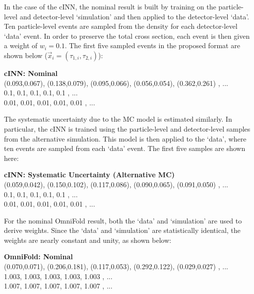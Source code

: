 \documentclass[a4paper,11pt]{article}
\begin{document}
In the case of the cINN, the nominal result is built by training on the particle-level and detector-level `simulation' and then applied to the detector-level `data'.  Ten particle-level events are sampled from the density for each detector-level `data' event.  In order to preserve the total cross section, each event is then given a weight of $w_i=0.1$.  The first five sampled events in the proposed format are shown below ($\vec{x}_i=(\tau_{1,i},\tau_{2,i})$):

\vspace{5mm}

 \begin{tcolorbox}
\textbf{cINN: Nominal}\\
(0.093,0.067), (0.138,0.079), (0.095,0.066), (0.056,0.054), (0.362,0.261) , ... \\
0.1, 0.1, 0.1, 0.1, 0.1 , ... \\
0.01, 0.01, 0.01, 0.01, 0.01 , ...
 \end{tcolorbox}
 
\noindent The systematic uncertainty due to the MC model is estimated similarly.  In particular, the cINN is trained using the particle-level and detector-level samples from the alternative simulation.  This model is then applied to the `data', where ten events are sampled from each `data' event.  The first five samples are shown here:
 
 \vspace{5mm}
 
  \begin{tcolorbox}
 \textbf{cINN: Systematic Uncertainty (Alternative MC)}\\
(0.059,0.042), (0.150,0.102), (0.117,0.086), (0.090,0.065), (0.091,0.050) , ... \\
0.1, 0.1, 0.1, 0.1, 0.1 , ... \\
0.01, 0.01, 0.01, 0.01, 0.01 , ...
 \end{tcolorbox}
 
  \vspace{2mm}
 
\noindent For the nominal OmniFold result, both the `data' and `simulation' are used to derive weights.  Since the `data' and `simulation' are statistically identical, the weights are nearly constant and unity, as shown below:
 
 \vspace{5mm}
 
 \begin{tcolorbox}
\textbf{OmniFold: Nominal}\\
(0.070,0.071), (0.206,0.181), (0.117,0.053), (0.292,0.122), (0.029,0.027) , ... \\
1.003, 1.003, 1.003, 1.003, 1.003 , ... \\
1.007, 1.007, 1.007, 1.007, 1.007 , ...
 \end{tcolorbox}
 
\end{document}
